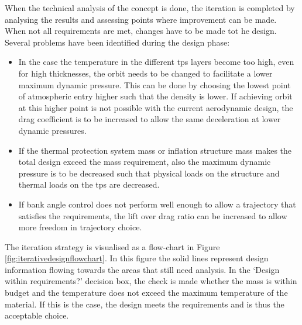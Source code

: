 When the technical analysis of the concept is done, the iteration is completed by analysing the results and assessing points where improvement can be made. When not all requirements are met, changes have to be made tot he design. Several problems have been identified during the design phase:
\begin{itemize}
	\item In the case the temperature in the different \gls{tps} layers become too high, even for high thicknesses, the orbit needs to be changed to facilitate a lower maximum dynamic pressure. This can be done by choosing the lowest point of atmospheric entry higher such that the density is lower. If achieving orbit at this higher point is not possible with the current aerodynamic design, the drag coefficient is to be increased to allow the same deceleration at lower dynamic pressures.
	
	\item If the thermal protection system mass or inflation structure mass makes the total design exceed the mass requirement, also the maximum dynamic pressure is to be decreased such that physical loads on the structure and thermal loads on the \gls{tps} are decreased.
	
	\item If bank angle control does not perform well enough to allow a trajectory that satisfies the requirements, the lift over drag ratio can be increased to allow more freedom in trajectory choice.
	
	
\end{itemize}


The iteration strategy is visualised as a flow-chart in Figure \ref{fig:iterativedesignflowchart}. In this figure the solid lines represent design information flowing towards the areas that still need analysis. In the `Design within requirements?' decision box, the check is made whether the mass is within budget and the temperature does not exceed the maximum temperature of the material. If this is the case, the design meets the requirements and is thus the acceptable choice.

